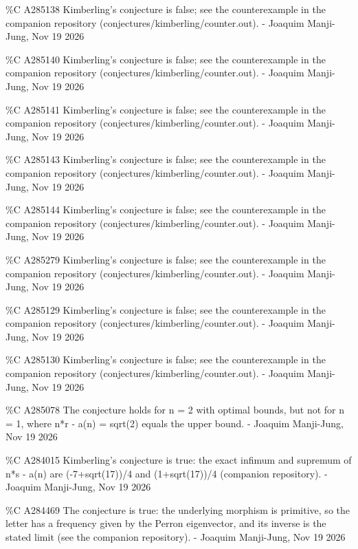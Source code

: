 {\%C A285138 Kimberling's conjecture is false; see the counterexample in the companion repository (conjectures/kimberling/counter.out). - Joaquim Manji-Jung, Nov 19 2026\par
\%C A285140 Kimberling's conjecture is false; see the counterexample in the companion repository (conjectures/kimberling/counter.out). - Joaquim Manji-Jung, Nov 19 2026\par
\%C A285141 Kimberling's conjecture is false; see the counterexample in the companion repository (conjectures/kimberling/counter.out). - Joaquim Manji-Jung, Nov 19 2026\par
\%C A285143 Kimberling's conjecture is false; see the counterexample in the companion repository (conjectures/kimberling/counter.out). - Joaquim Manji-Jung, Nov 19 2026\par
\%C A285144 Kimberling's conjecture is false; see the counterexample in the companion repository (conjectures/kimberling/counter.out). - Joaquim Manji-Jung, Nov 19 2026\par
\%C A285279 Kimberling's conjecture is false; see the counterexample in the companion repository (conjectures/kimberling/counter.out). - Joaquim Manji-Jung, Nov 19 2026\par
\%C A285129 Kimberling's conjecture is false; see the counterexample in the companion repository (conjectures/kimberling/counter.out). - Joaquim Manji-Jung, Nov 19 2026\par
\%C A285130 Kimberling's conjecture is false; see the counterexample in the companion repository (conjectures/kimberling/counter.out). - Joaquim Manji-Jung, Nov 19 2026\par
\%C A285078 The conjecture holds for n = 2 with optimal bounds, but not for n = 1, where n*r - a(n) = sqrt(2) equals the upper bound. - Joaquim Manji-Jung, Nov 19 2026\par
\%C A284015 Kimberling's conjecture is true: the exact infimum and supremum of n*s - a(n) are (-7+sqrt(17))/4 and (1+sqrt(17))/4 (companion repository). - Joaquim Manji-Jung, Nov 19 2026\par
\%C A284469 The conjecture is true: the underlying morphism is primitive, so the letter has a frequency given by the Perron eigenvector, and its inverse is the stated limit (see the companion repository). - Joaquim Manji-Jung, Nov 19 2026\par
}
